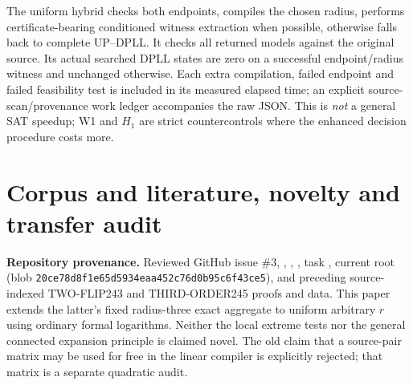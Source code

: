 \documentclass[11pt]{article}
\begin{document}
\begin{center}\small
{}
\end{center}
\noindent The uniform hybrid checks both endpoints, compiles the chosen radius, performs certificate-bearing conditioned witness extraction when possible, otherwise falls back to complete UP--DPLL. It checks all returned models against the original source. Its actual searched DPLL states are zero on a successful endpoint/radius witness and unchanged otherwise. Each extra compilation, failed endpoint and failed feasibility test is included in its measured elapsed time; an explicit source-scan/provenance work ledger accompanies the raw JSON. This is \emph{not} a general SAT speedup; W1 and $H_1$ are strict countercontrols where the enhanced decision procedure costs more.

\section{Corpus and literature, novelty and transfer audit}
\noindent\textbf{Repository provenance.} Reviewed GitHub issue \#3, , , , task , current root  (blob \texttt{20ce78d8f1e65d5934eaa452c76d0b95c6f43ce5}), and preceding source-indexed TWO-FLIP243 and THIRD-ORDER245 proofs and data. This paper extends the latter's fixed radius-three exact aggregate to uniform arbitrary $r$ using ordinary formal logarithms. Neither the local extreme tests nor the general connected expansion principle is claimed novel. The old claim that a source-pair matrix may be used for free in the linear compiler is explicitly rejected; that matrix is a separate quadratic audit.
\end{document}
